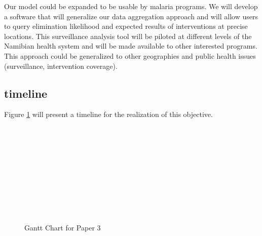 Our model could be expanded to be usable by malaria programs. We will develop a software that will generalize our data aggregation approach and will allow users to query elimination likelihood and expected results of interventions at precise locations. This surveillance analysis tool will be piloted at different levels of the Namibian health system and will be made available to other interested programs. This approach could be generalized to other geographies and public health issues (surveillance, intervention coverage).


\subsection{timeline}

Figure \ref{Gantt3} will present a timeline for the realization of this objective.

\begin{figure}[h]
\begin{ganttchart}{1}{24}
 \\
 \\
 \\
 \\
 \\
 \\
 \\
 \\
 \\
\end{ganttchart}
\caption{Gantt Chart for Paper 3}
\label{Gantt3}
\end{figure}
